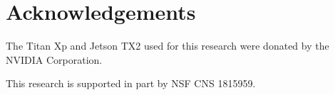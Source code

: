 \section*{Acknowledgements} \label{acknowledge}
The Titan Xp and Jetson TX2 used for this research were donated by the
NVIDIA Corporation.

This research is supported in part by NSF CNS 1815959.

